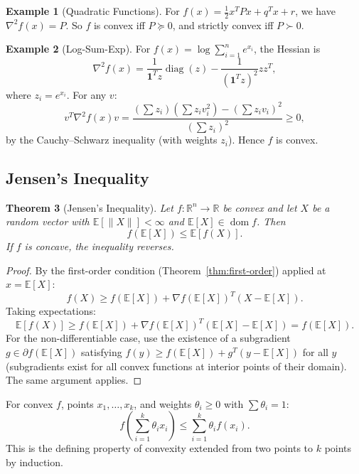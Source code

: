 \documentclass[11pt,a4paper]{article}
\newtheorem{theorem}{Theorem}[section]
\theoremstyle{definition}
\newtheorem{example}[theorem]{Example}
\theoremstyle{remark}
\newcommand{\R}{\mathbb{R}}
\newcommand{\E}{\mathbb{E}}
\DeclareMathOperator{\dom}{dom}
\DeclareMathOperator{\diag}{diag}
\begin{document}
\begin{example}[Quadratic Functions]
\label{ex:quadratic-convexity}
For $f(x) = \tfrac{1}{2} x^T P x + q^T x + r$, we have $\nabla^2 f(x) = P$. So $f$ is
convex iff $P \succeq 0$, and strictly convex iff $P \succ 0$.
\end{example}

\begin{example}[Log-Sum-Exp]
\label{ex:lse-convex}
For $f(x) = \log \sum_{i=1}^n e^{x_i}$, the Hessian is
\[
  \nabla^2 f(x) = \frac{1}{\mathbf{1}^T z} \diag(z)
    - \frac{1}{(\mathbf{1}^T z)^2} z z^T,
\]
where $z_i = e^{x_i}$. For any $v$:
\[
  v^T \nabla^2 f(x) v = \frac{(\sum z_i)(\sum z_i v_i^2) - (\sum z_i v_i)^2}
  {(\sum z_i)^2} \ge 0,
\]
by the Cauchy--Schwarz inequality (with weights $z_i$). Hence $f$ is convex.
\end{example}

\subsection{Jensen's Inequality}

\begin{theorem}[Jensen's Inequality]
\label{thm:jensen}
Let $f : \R^n \to \R$ be convex and let $X$ be a random vector with $\E[\|X\|] < \infty$
and $\E[X] \in \dom f$. Then
\[
  f(\E[X]) \le \E[f(X)].
\]
If $f$ is concave, the inequality reverses.
\end{theorem}

\begin{proof}
By the first-order condition (Theorem~\ref{thm:first-order}) applied at $x = \E[X]$:
\[
  f(X) \ge f(\E[X]) + \nabla f(\E[X])^T (X - \E[X]).
\]
Taking expectations:
\[
  \E[f(X)] \ge f(\E[X]) + \nabla f(\E[X])^T (\E[X] - \E[X]) = f(\E[X]).
\]
For the non-differentiable case, use the existence of a subgradient $g \in \partial
f(\E[X])$ satisfying $f(y) \ge f(\E[X]) + g^T(y - \E[X])$ for all $y$ (subgradients
exist for all convex functions at interior points of their domain). The same argument
applies.
\end{proof}

\begin{keyresult}[title={Jensen's Inequality -- Finite Form}]
For convex $f$, points $x_1, \ldots, x_k$, and weights $\theta_i \ge 0$ with
$\sum \theta_i = 1$:
\[
  f\!\left(\sum_{i=1}^k \theta_i x_i\right) \le \sum_{i=1}^k \theta_i f(x_i).
\]
This is the defining property of convexity extended from two points to $k$ points by
induction.
\end{keyresult}
\end{document}
